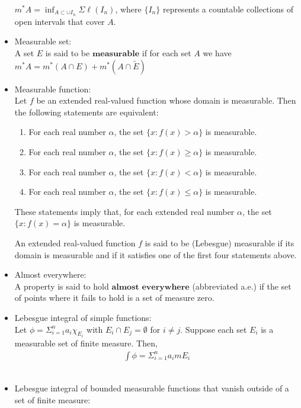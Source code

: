\documentclass[12pt]{article}
\begin{document}
\begin{itemize}
$m^*A = \inf_{A \subset \cup I_n} \Sigma \ell(I_n)$, where $\{I_n\}$ represents a countable collections of open intervals that cover $A$.
\\
\item Measurable set:\\

A set $E$ is said to be $\textbf{measurable}$ if for each set $A$ we have $m^*A = m^*(A \cap E) + m^*(A \cap \tilde{E})$
\\
\item Measurable function:\\

Let $f$ be an extended real-valued function whose domain is measurable. Then the following statements are equivalent:
\begin{enumerate}
\item For each real number $\alpha$, the set $\{x: f(x) > \alpha\}$ is measurable.
\item For each real number $\alpha$, the set $\{x: f(x) \geq \alpha\}$ is measurable.
\item For each real number $\alpha$, the set $\{x: f(x) < \alpha\}$ is measurable.
\item For each real number $\alpha$, the set $\{x: f(x) \leq \alpha\}$ is measurable.
\end{enumerate}
These statements imply that, for each extended real number $\alpha$, the set $\{x: f(x) = \alpha\}$ is measurable.

An extended real-valued function $f$ is said to be (Lebesgue) measurable if its domain is measurable and if it satisfies one of the first four statements above.
\\
\item Almost everywhere:\\

A property is said to hold $\textbf{almost everywhere}$ (abbreviated a.e.) if the set of points where it fails to hold is a set of measure zero.
\\
\item Lebesgue integral of simple functions:\\

Let $\phi = \Sigma_{i=1}^n a_i \chi_{E_i}$ with $E_i \cap E_j = \emptyset$ for $i \neq j$. Suppose each set $E_i$ is a measurable set of finite measure. Then,
\begin{align*}
\int \phi = \Sigma_{i=1}^n a_i mE_i
\end{align*}
\\
\item Lebesgue integral of bounded measurable functions that vanish outside of a set of  finite measure:\\


\end{itemize}
\end{document}
